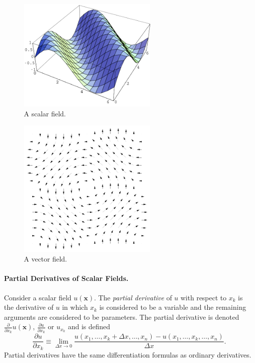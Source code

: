\begin{figure}[h!]
  \begin{center}
    \includegraphics[width=0.6\textwidth]{calculus/vector/scafield}
  \end{center}
  \caption{A scalar field.}
  \label{figure scalar field}
\end{figure}


\begin{figure}[h!]
  \begin{center}
    \includegraphics[width=0.6\textwidth]{calculus/vector/vecfield}
  \end{center}
  \caption{A vector field.}
  \label{figure vector field}
\end{figure}




\paragraph{Partial Derivatives of Scalar Fields.}
Consider a scalar field $u(\mathbf{x})$.  The \textit{partial derivative}
of $u$ with respect to $x_k$ is the derivative of $u$ in which $x_k$ is 
considered to be a variable and the remaining arguments are considered to be 
parameters.  The partial derivative is denoted 
$\frac{\partial}{\partial x_k} u(\mathbf{x})$, $\frac{\partial u}{\partial x_k}$ 
or $u_{x_k}$ and is defined
\[
\frac{\partial u}{\partial x_k} \equiv \lim_{\Delta x \to 0}
\frac{u(x_1, \ldots, x_k + \Delta x, \ldots, x_n) 
  - u(x_1, \ldots, x_k, \ldots, x_n)}{\Delta x}.
\]
Partial derivatives have the 
same differentiation formulas as ordinary derivatives.  

